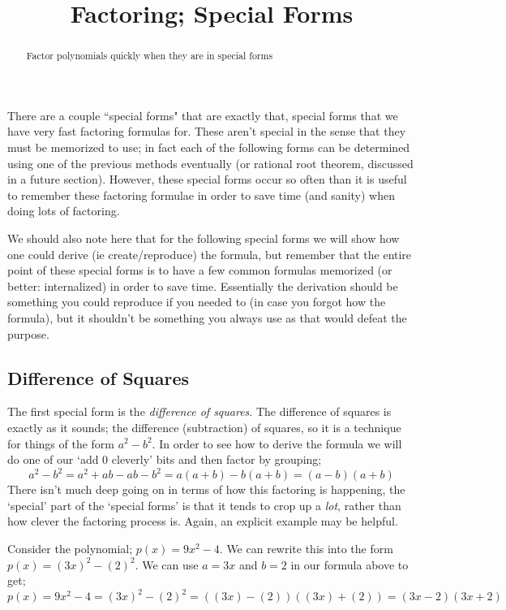 \documentclass{ximera}
\title{Factoring; Special Forms}
\begin{document}
\begin{abstract}
    Factor polynomials quickly when they are in special forms
\end{abstract}
\maketitle


There are a couple ``special forms" that are exactly that, special forms that we have very fast factoring formulas for. These aren't special in the sense that they must be memorized to use; in fact each of the following forms can be determined using one of the previous methods eventually (or rational root theorem, discussed in a future section). However, these special forms occur so often than it is useful to remember these factoring formulae in order to save time (and sanity) when doing lots of factoring.

We should also note here that for the following special forms we will show how one could derive (ie create/reproduce) the formula, but remember that the entire point of these special forms is to have a few common formulas memorized (or better: internalized) in order to save time. Essentially the derivation should be something you could reproduce if you needed to (in case you forgot how the formula), but it shouldn't be something you always use as that would defeat the purpose. 

\subsection*{Difference of Squares}
    The first special form is the \textit{difference of squares}. The difference of squares is exactly as it sounds; the difference (subtraction) of squares, so it is a technique for things of the form $a^2 - b^2$. In order to see how to derive the formula we will do one of our `add 0 cleverly' bits and then factor by grouping;
    \[
        a^2 - b^2 = a^2 + ab - ab - b^2
        = a(a + b) - b(a + b)
        = (a - b)(a + b)
    \]
    There isn't much deep going on in terms of how this factoring is happening, the `special' part of the `special forms' is that it tends to crop up a \textit{lot}, rather than how clever the factoring process is. Again, an explicit example may be helpful.

    \begin{example} 
    Consider the polynomial; $p(x) = 9x^2 - 4$. We can rewrite this into the form $p(x) = (3x)^2 - (2)^2$. We can use $a = 3x$ and $b = 2$ in our formula above to get;
    \[
        p(x) = 9x^2 - 4
        = (3x)^2 - (2)^2
        = ((3x) - (2))((3x) + (2))
        = (3x - 2)(3x + 2)
    \]
    \end{example}
    
\end{document}

